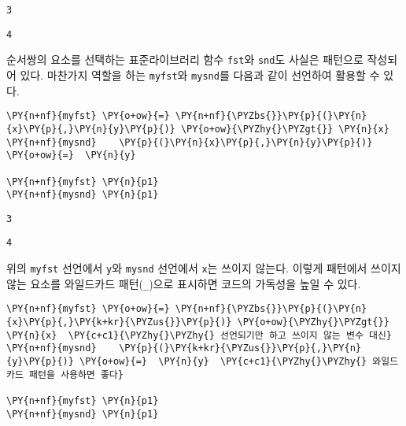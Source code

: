     
    
    \begin{Verbatim}[commandchars=\\\{\}]
3
    \end{Verbatim}

    
    
    \begin{Verbatim}[commandchars=\\\{\}]
4
    \end{Verbatim}

    
    \noindent 순서쌍의 요소를 선택하는 표준라이브러리 함수 \texttt{fst}와
\texttt{snd}도 사실은 패턴으로 작성되어 있다. 마찬가지 역할을 하는
\texttt{myfst}와 \texttt{mysnd}를 다음과 같이 선언하여 활용할 수 있다.

    \begin{tcolorbox}[breakable, size=fbox, boxrule=1pt, pad at break*=1mm,colback=cellbackground, colframe=cellborder, top=.75ex]
\begin{Verbatim}[commandchars=\\\{\}]
\PY{n+nf}{myfst} \PY{o+ow}{=} \PY{n+nf}{\PYZbs{}}\PY{p}{(}\PY{n}{x}\PY{p}{,}\PY{n}{y}\PY{p}{)} \PY{o+ow}{\PYZhy{}\PYZgt{}} \PY{n}{x}
\PY{n+nf}{mysnd}    \PY{p}{(}\PY{n}{x}\PY{p}{,}\PY{n}{y}\PY{p}{)} \PY{o+ow}{=}  \PY{n}{y}

\PY{n+nf}{myfst} \PY{n}{p1}
\PY{n+nf}{mysnd} \PY{n}{p1}
\end{Verbatim}
\end{tcolorbox}

    
    \begin{Verbatim}[commandchars=\\\{\}]
3
    \end{Verbatim}

    
    
    \begin{Verbatim}[commandchars=\\\{\}]
4
    \end{Verbatim}

    
    위의 \texttt{myfst} 선언에서 \texttt{y}와 \texttt{mysnd} 선언에서
\texttt{x}는 쓰이지 않는다. 이렇게 패턴에서 쓰이지 않는 요소를
와일드카드 패턴(\texttt{\_})으로 표시하면 코드의 가독성을 높일 수 있다.

    \begin{tcolorbox}[breakable, size=fbox, boxrule=1pt, pad at break*=1mm,colback=cellbackground, colframe=cellborder, top=.75ex]
\begin{Verbatim}[commandchars=\\\{\}]
\PY{n+nf}{myfst} \PY{o+ow}{=} \PY{n+nf}{\PYZbs{}}\PY{p}{(}\PY{n}{x}\PY{p}{,}\PY{k+kr}{\PYZus{}}\PY{p}{)} \PY{o+ow}{\PYZhy{}\PYZgt{}} \PY{n}{x}  \PY{c+c1}{\PYZhy{}\PYZhy{} 선언되기만 하고 쓰이지 않는 변수 대신}
\PY{n+nf}{mysnd}    \PY{p}{(}\PY{k+kr}{\PYZus{}}\PY{p}{,}\PY{n}{y}\PY{p}{)} \PY{o+ow}{=}  \PY{n}{y}  \PY{c+c1}{\PYZhy{}\PYZhy{} 와일드카드 패턴을 사용하면 좋다}

\PY{n+nf}{myfst} \PY{n}{p1}
\PY{n+nf}{mysnd} \PY{n}{p1}
\end{Verbatim}
\end{tcolorbox}

